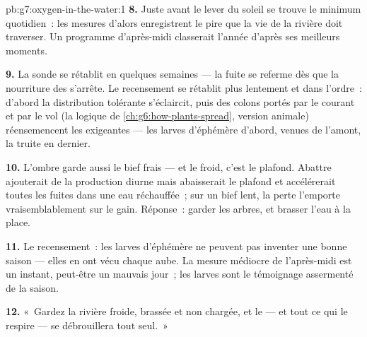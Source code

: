 \begin{solution}{pb:g7:oxygen-in-the-water:1}
\textbf{8.} Juste avant le lever du soleil se trouve le minimum
quotidien~: les mesures d'alors enregistrent le pire que la vie de
la rivière doit traverser. Un programme d'après-midi classerait
l'année d'après ses meilleurs moments.

\textbf{9.} La sonde se rétablit en quelques semaines --- la fuite
se referme dès que la nourriture des  s'arrête. Le
recensement se rétablit plus lentement et dans l'ordre~: d'abord la
distribution tolérante s'éclaircit, puis des colons portés par le
courant et par le vol (la logique de
\cref{ch:g6:how-plants-spread}, version animale) réensemencent les
 exigeantes --- les larves d'éphémère d'abord, venues de
l'amont, la truite en dernier.

\textbf{10.} L'ombre garde aussi le bief frais --- et le froid,
c'est le plafond. Abattre ajouterait de la production diurne mais
abaisserait le plafond et accélérerait toutes les fuites dans une
eau réchauffée~; sur un bief lent, la perte l'emporte
vraisemblablement sur le gain. Réponse~: garder les arbres, et
brasser l'eau à la place.

\textbf{11.} Le recensement~: les larves d'éphémère ne peuvent pas
inventer une bonne saison --- elles en ont vécu chaque aube. La
mesure médiocre de l'après-midi est un instant, peut-être un mauvais
jour~; les larves sont le témoignage assermenté de la saison.

\textbf{12.} «~Gardez la rivière froide, brassée et non chargée, et
le  --- et tout ce qui le respire --- se débrouillera tout
seul.~»
\end{solution}
